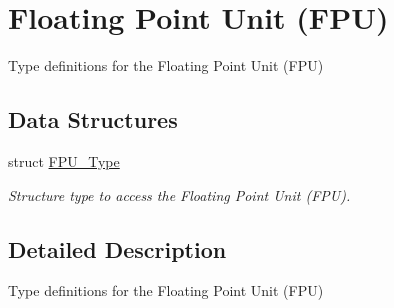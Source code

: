 \hypertarget{group___c_m_s_i_s___f_p_u}{\section{Floating Point Unit (F\-P\-U)}
\label{group___c_m_s_i_s___f_p_u}
}


Type definitions for the Floating Point Unit (F\-P\-U)  


\subsection*{Data Structures}
\begin{DoxyCompactItemize}
\item 
struct \hyperlink{struct_f_p_u___type}{F\-P\-U\-\_\-\-Type}
\begin{DoxyCompactList}\small\item\em Structure type to access the Floating Point Unit (F\-P\-U). \end{DoxyCompactList}\end{DoxyCompactItemize}


\subsection{Detailed Description}
Type definitions for the Floating Point Unit (F\-P\-U) 